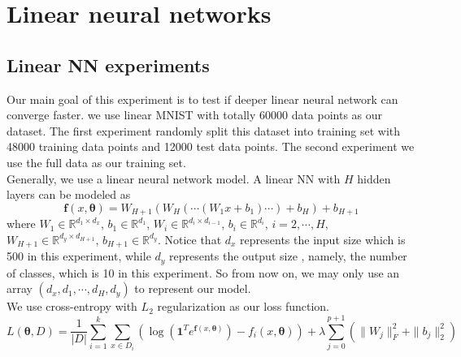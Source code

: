 
\newpage

 \section{Linear neural networks}
 
\subsection{Linear NN experiments}
Our main goal of this experiment is to test if deeper linear neural network can converge faster. we use linear MNIST with totally 60000 data points as our dataset. The first experiment randomly split this dataset into training set with 48000 training data points and 12000 test data points. The second experiment we use the full data as our training set.\\
Generally, we use a linear neural network model.  A linear NN with $H$ hidden layers can be modeled as
\begin{equation}
	\bm f(x,\bm\theta) = W_{H+1}(W_H(\cdots(W_1 x + b_1)\cdots)+b_H)+b_{H+1}
\end{equation}
where $W_1\in \mathbb{R}^{d_1\times d_x}$, $b_1 \in \mathbb{R}^{d_1}$, $W_i\in \mathbb{R}^{d_{i}\times d_{i-1}}$, $b_i \in \mathbb{R}^{d_i}$, $i = 2,\cdots,H$, $W_{H+1}\in \mathbb{R}^{d_y\times d_{H+1}}$, $b_{H+1} \in \mathbb{R}^{d_y}$. Notice that $d_x$ represents the input size which is 500 in this experiment, while $d_y$ represents the output size , namely, the number of classes, which is 10 in this experiment. So from now on, we may only  use an array $(d_x,d_1,\cdots,d_H,d_y)$ to represent our model.\\
We use cross-entropy with $L_2$ regularization as our loss function.
\begin{equation}
	L(\bm\theta,D) = \frac{1}{|D|} \sum_{i = 1}^k \sum_{x\in D_i} (\log ({\bm 1}^T e^{\bm f(x,\bm\theta)}) - f_i(x,\bm\theta)) + \lambda \sum_{j = 0}^{p+1} (\|W_j\|_F^2 + \|b_j\|_2^2)
\end{equation}

